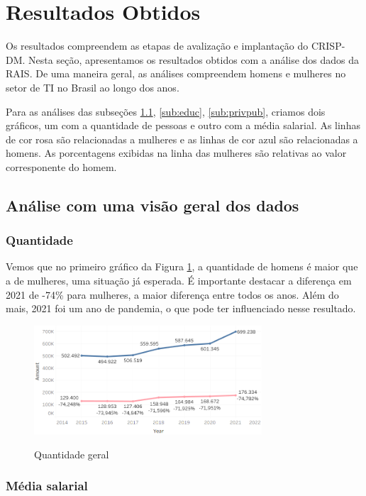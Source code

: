 \section{Resultados Obtidos}

Os resultados compreendem as etapas de avalização e implantação do CRISP-DM. Nesta seção, apresentamos os resultados obtidos com a análise dos dados da RAIS. De uma maneira geral, as análises compreendem homens e mulheres no setor de TI no Brasil ao longo dos anos. 

Para as análises das subseções \ref{sub:geral}, \ref{sub:educ}, \ref{sub:privpub}, criamos dois gráficos, um com a quantidade de pessoas e outro com a média salarial. As linhas de cor rosa são relacionadas a mulheres e as linhas de cor azul são relacionadas a homens. As porcentagens exibidas na linha das mulheres são relativas ao valor corresponente do homem. 

\subsection{Análise com uma visão geral dos dados} \label{sub:geral}

\subsubsection{Quantidade}

Vemos que no primeiro gráfico da Figura \ref{fig_1_qnt}, a quantidade de homens é maior que a de mulheres, uma situação já esperada. É importante destacar a diferença em 2021 de -74\% para mulheres, a maior diferença entre todos os anos. Além do mais, 2021 foi um ano de pandemia, o que pode ter influenciado nesse resultado.

\begin{figure}[htbp]
	{
		\includegraphics[width=85mm]{assets/1_qnt.PNG}
	}
	\caption{Quantidade geral}
	\label{fig_1_qnt}
\end{figure}

\subsubsection{Média salarial}

